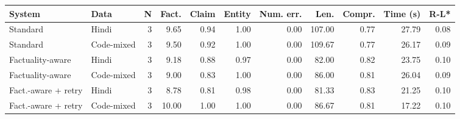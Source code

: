 \begin{tabular}{llrrrrrrrrr}
\toprule
System & Data & N & Fact. & Claim & Entity & Num. err. & Len. & Compr. & Time (s) & R-L* \\
\midrule
Standard & Hindi & 3 & 9.65 & 0.94 & 1.00 & 0.00 & 107.00 & 0.77 & 27.79 & 0.08 \\
Standard & Code-mixed & 3 & 9.50 & 0.92 & 1.00 & 0.00 & 109.67 & 0.77 & 26.17 & 0.09 \\
Factuality-aware & Hindi & 3 & 9.18 & 0.88 & 0.97 & 0.00 & 82.00 & 0.82 & 23.75 & 0.10 \\
Factuality-aware & Code-mixed & 3 & 9.00 & 0.83 & 1.00 & 0.00 & 86.00 & 0.81 & 26.04 & 0.09 \\
Fact.-aware + retry & Hindi & 3 & 8.78 & 0.81 & 0.98 & 0.00 & 81.33 & 0.83 & 21.25 & 0.10 \\
Fact.-aware + retry & Code-mixed & 3 & 10.00 & 1.00 & 1.00 & 0.00 & 86.67 & 0.81 & 17.22 & 0.10 \\
\bottomrule
\end{tabular}
